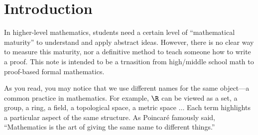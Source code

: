 \documentclass[10pt]{article}
\begin{document}
\def\htitle{An Introduction to Proofs}
\def\hauthor{Hassium}
\hsetup
\htoc
\hmain
\section*{Introduction}
In higher-level mathematics, students need a certain level of ``mathematical maturity'' to understand and apply abstract ideas. However, there is no clear way to measure this maturity, nor a definitive method to teach someone how to write a proof. This note is intended to be a trnasition from high/middle school math to proof-based formal mathematics.
\par
As you read, you may notice that we use different names for the same object—a common practice in mathematics. For example, $\R$ can be viewed as a set, a group, a ring, a field, a topological space, a metric space $\dots$ Each term highlights a particular aspect of the same structure. As Poincaré famously said, ``Mathematics is the art of giving the same name to different things.''
\end{document}
